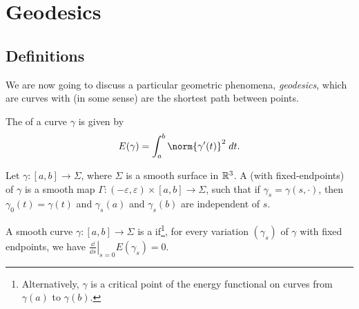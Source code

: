 \documentclass[a4paper]{article}
\begin{document}






\section{Geodesics}

\subsection{Definitions}

We are now going to discuss a particular geometric phenomena, \emph{geodesics}, which are curves with (in some sense) are the shortest path between points.

\begin{definition}[Energy]
    The  of a curve $\gamma$ is given by 
    $$E(\gamma) = \int_a^b \norm{\gamma'(t)}^2 \dd t.$$
\end{definition}

\begin{definition}
    Let $\gamma: [a, b] \rightarrow \Sigma$, where $\Sigma$ is a smooth surface in $\mathbb{R}^3$. A  (with fixed-endpoints) of $\gamma$ is a smooth map $\Gamma: (-\varepsilon, \varepsilon) \times [a, b] \rightarrow \Sigma$, such that if $\gamma_s = \gamma(s, \cdot)$, then $\gamma_0(t) = \gamma(t)$ and $\gamma_s(a)$ and $\gamma_s(b)$ are independent of $s$.
\end{definition}

\begin{definition}[Geodesic]
    A smooth curve $\gamma: [a, b] \rightarrow \Sigma$ is a  if\footnote{Alternatively, $\gamma$ is a critical point of the energy functional on curves from $\gamma(a)$ to $\gamma(b)$.}, for every variation $(\gamma_s)$ of $\gamma$ with fixed endpoints, we have $\left.\frac{\dd}{\dd s}\right|_{s = 0} E(\gamma_s) = 0$.
\end{definition}
\end{document}
